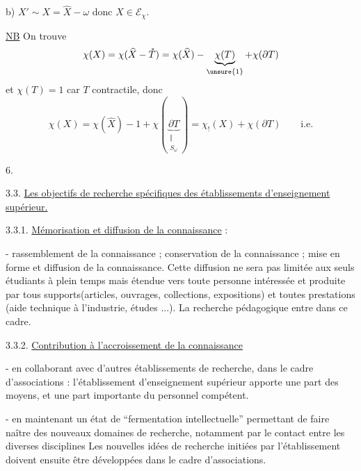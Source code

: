 b) $X'\sim X=\widehat X-\omega$ donc $X\in\mathcal E_\chi$.

\uline{NB} On trouve
\[
\chi(X)=\chi(\widehat X-\mathring T)=\chi(\widehat X)-\underbrace{\chi(T)}_{\unsure{1}}+\chi(\partial T)
\]
et $\chi(T)=1$ car $T$ contractile, donc
\[
\chi(X)=\chi(\widehat X)-1+\chi(\underbrace{\partial T}_{\substack{\Vert\\S_\omega}})=\chi_!(X)+\chi(\partial T)\qquad\text{i.e.}
\]


\begin{flushright}6.\end{flushright}

3.3. \uline{Les objectifs de recherche spécifiques des établissements d'enseignement supérieur.}

3.3.1. \uline{Mémorisation et diffusion de la connaissance} :

- rassemblement de la connaissance ; conservation de la connaissance ; mise en forme et diffusion de la connaissance. Cette diffusion ne sera pas limitée aux seuls étudiants à plein temps mais étendue vers toute personne intéressée et produite par tous supports(articles, ouvrages, collections, expositions) et toutes prestations (aide technique à l'industrie, études ...). La recherche pédagogique entre dans ce cadre.

3.3.2. \uline{Contribution à l'accroissement de la connaissance}

- en collaborant avec d'autres établissements de recherche, dans le cadre d'associations : l'établissement d'enseignement supérieur apporte une part des moyens, et une part importante du personnel compétent.

- en maintenant un état de ``fermentation intellectuelle'' permettant de faire naître des nouveaux domaines de recherche, notamment par le contact entre les diverses disciplines Les nouvelles idées de recherche\inserted{,} initiées par l'établissement\inserted{,} doivent\inserted{,} ensuite être développées dans le cadre d'associations.

